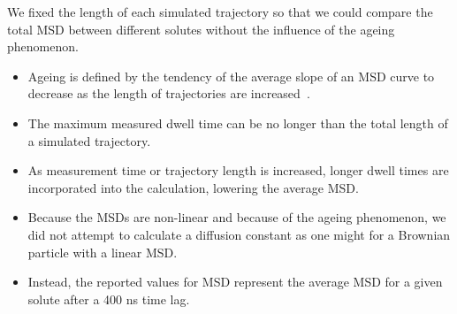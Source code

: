 \documentclass{article}
\begin{document}
  \noindent We fixed the length of each simulated trajectory so that we could compare
  the total MSD between different solutes without the influence of the ageing phenomenon.
  \begin{itemize}
	\item Ageing is defined by the tendency of the average slope of an MSD curve to decrease
	as the length of trajectories are increased~\cite{metzler_anomalous_2014}.
	\item The maximum measured dwell time can be no longer than the total length
	of a simulated trajectory. 
	\item As measurement time or trajectory length is increased, longer dwell times
	are incorporated into the calculation, lowering the average MSD.
	\item Because the MSDs are non-linear and because of the ageing phenomenon, we
    did not attempt to calculate a diffusion constant as one might for a Brownian
    particle with a linear MSD.
	\item Instead, the reported values for MSD represent the average MSD for a given
	solute after a 400 ns time lag.
  \end{itemize} 
  
  
\end{document}
